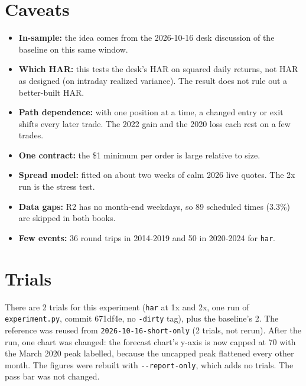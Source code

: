 \documentclass{article}
\begin{document}
\section{Caveats}

\begin{itemize}

\item \textbf{In-sample:} the idea comes from the 2026-10-16 desk discussion of the baseline on this same window.

\item \textbf{Which HAR:} this tests the desk's HAR on squared daily returns, not HAR as designed (on intraday realized variance). The result does not rule out a better-built HAR.

\item \textbf{Path dependence:} with one position at a time, a changed entry or exit shifts every later trade. The 2022 gain and the 2020 loss each rest on a few trades.

\item \textbf{One contract:} the \$1 minimum per order is large relative to size.

\item \textbf{Spread model:} fitted on about two weeks of calm 2026 live quotes. The 2x run is the stress test.

\item \textbf{Data gaps:} R2 has no month-end weekdays, so 89 scheduled times (3.3\%) are skipped in both books.

\item \textbf{Few events:} 36 round trips in 2014-2019 and 50 in 2020-2024 for \texttt{har}.

\end{itemize}

\section{Trials}

There are 2 trials for this experiment (\texttt{har} at 1x and 2x, one run of \texttt{experiment.\allowbreak{}py}, commit 671df4e, no \texttt{-\allowbreak{}dirty} tag), plus the baseline's 2. The reference was reused from \texttt{2026-\allowbreak{}10-\allowbreak{}16-\allowbreak{}short-\allowbreak{}only} (2 trials, not rerun). After the run, one chart was changed: the forecast chart's y-axis is now capped at 70 with the March 2020 peak labelled, because the uncapped peak flattened every other month. The figures were rebuilt with \texttt{-\allowbreak{}-\allowbreak{}report-\allowbreak{}only}, which adds no trials. The pass bar was not changed.
\end{document}

